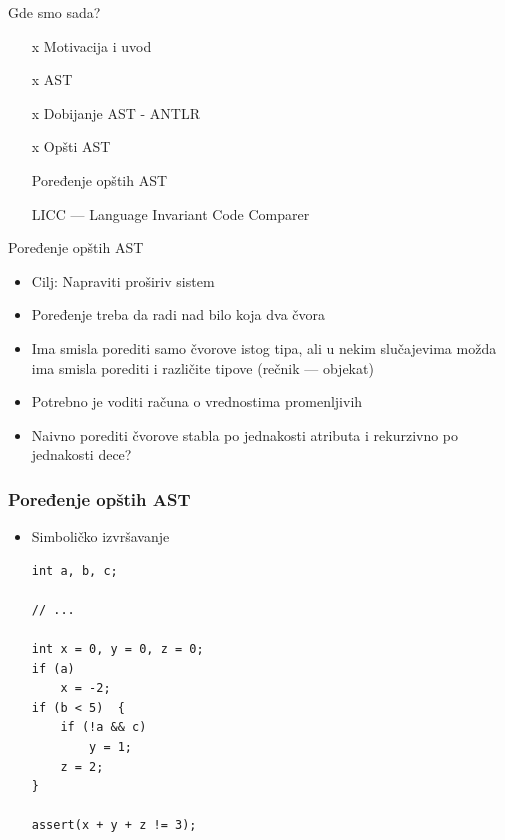 \documentclass{beamer}
\begin{document}
\begin{frame}{Gde smo sada?}
    \begin{itemize}
        \item [x] Motivacija i uvod 
        \item [x] AST
        \item [x] Dobijanje AST - ANTLR
        \item [x] Op\v{s}ti AST
        \item [ ] Poređenje op\v{s}tih AST
        \item [ ] LICC --- Language Invariant Code Comparer
    \end{itemize}
\end{frame}

\begin{frame}{Poređenje opštih AST}
    \begin{itemize}
        \item Cilj: Napraviti pro\v{s}iriv sistem
        \item Poređenje treba da radi nad bilo koja dva \v{c}vora
        \item Ima smisla porediti samo \v{c}vorove istog tipa, ali u nekim slu\v{c}ajevima mo\v{z}da ima smisla porediti i razli\v{c}ite tipove (re\v{c}nik --- objekat)
        \item Potrebno je voditi ra\v{c}una o vrednostima promenljivih
        \item Naivno porediti \v{c}vorove stabla po jednakosti atributa i rekurzivno po jednakosti dece?
    \end{itemize}
\end{frame}

\begin{frame}[fragile]
    \frametitle{Poređenje opštih AST}
    \begin{itemize}
        \item Simboli\v{c}ko izvr\v{s}avanje 
\begin{lstlisting}
int a, b, c;

// ...

int x = 0, y = 0, z = 0;
if (a)      
    x = -2;
if (b < 5)  {
    if (!a && c)    
        y = 1;
    z = 2;
}

assert(x + y + z != 3);
\end{lstlisting}
    \end{itemize}
\end{frame}
\end{document}
